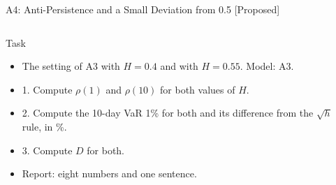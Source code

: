 \begin{frame}{A4: Anti-Persistence and a Small Deviation from 0.5 [Proposed]}
\propsub
\itemsize{\scriptsize}
\begin{columns}[T]
\begin{column}{\taskw}
\begin{block}{Task}
\begin{itemize}
    \item The setting of A3 with $H = 0.4$ and with $H = 0.55$. Model: A3.
    \item 1. Compute $\rho(1)$ and $\rho(10)$ for both values of $H$.
    \item 2. Compute the 10-day VaR 1\% for both and its difference from the $\sqrt{h}$ rule, in \%.
    \item 3. Compute $D$ for both.
    \item Report: eight numbers and one sentence.
\end{itemize}
\end{block}
\end{column}
\begin{column}{\solw}
\end{column}
\end{columns}
\end{frame}

